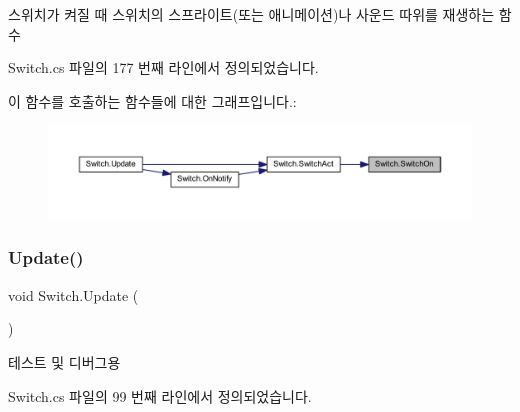 스위치가 켜질 때 스위치의 스프라이트(또는 애니메이션)나 사운드 따위를 재생하는 함수 



Switch.\+cs 파일의 177 번째 라인에서 정의되었습니다.


\begin{DoxyCode}{0}

\end{DoxyCode}
이 함수를 호출하는 함수들에 대한 그래프입니다.\+:
\nopagebreak
\begin{figure}[H]
\begin{center}
\leavevmode
\includegraphics[width=350pt]{d9/d47/class_switch_ad2aa17a4a56cc1fe70a96dc94371c388_icgraph}
\end{center}
\end{figure}
\mbox{\label{class_switch_a7aa3b2489c41c573dc34ef3014faf4a4}} 
\subsubsection{\texorpdfstring{Update()}{Update()}}
{\footnotesize\ttfamily void Switch.\+Update (\begin{DoxyParamCaption}{ }\end{DoxyParamCaption})\hspace{0.3cm}{\ttfamily [private]}}



테스트 및 디버그용 



Switch.\+cs 파일의 99 번째 라인에서 정의되었습니다.


